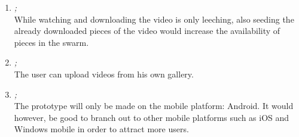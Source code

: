 \begin{enumerate}
\item \emph{;}\\
While watching and downloading the video is only leeching, also seeding the already downloaded pieces of the video would increase the availability of pieces in the swarm.

\item \emph{;}\\
The user can upload videos from his own gallery.

\item \emph{;}\\
The prototype will only be made on the mobile platform: Android. It would however, be good to branch out to other mobile platforms such as iOS and Windows mobile in order to attract more users.

\end{enumerate}

